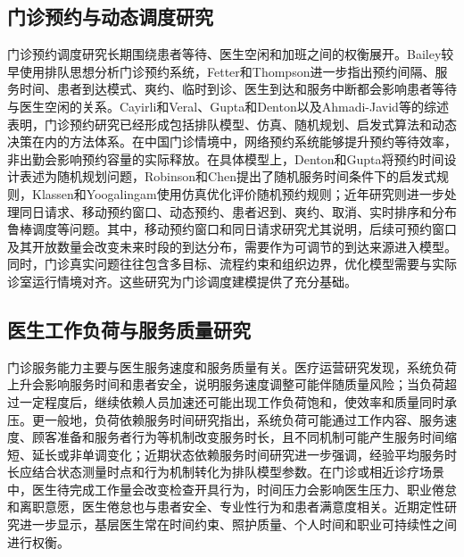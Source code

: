 \documentclass[a4paper,zihao=-4]{ctexart}
\numberwithin{figure}{section}
\numberwithin{table}{section}
\begin{document}
\subsection{门诊预约与动态调度研究}

门诊预约调度研究长期围绕患者等待、医生空闲和加班之间的权衡展开。Bailey较早使用排队思想分析门诊预约系统\citep{Bailey1952}，Fetter和Thompson进一步指出预约间隔、服务时间、患者到达模式、爽约、临时到诊、医生到达和服务中断都会影响患者等待与医生空闲的关系\citep{FetterThompson1966}。Cayirli和Veral、Gupta和Denton以及Ahmadi-Javid等的综述表明，门诊预约研究已经形成包括排队模型、仿真、随机规划、启发式算法和动态决策在内的方法体系\citep{CayirliVeral2003,GuptaDenton2008,AhmadiJavid2017,Hulshof2012,YounGeismarPinedo2022}。在中国门诊情境中，网络预约系统能够提升预约等待效率，非出勤会影响预约容量的实际释放\citep{CaoWanTuShangEtAl2011}。在具体模型上，Denton和Gupta将预约时间设计表述为随机规划问题\citep{DentonGupta2003}，Robinson和Chen提出了随机服务时间条件下的启发式规则\citep{RobinsonChen2003}，Klassen和Yoogalingam使用仿真优化评价随机预约规则\citep{KlassenYoogalingam2009}；近年研究则进一步处理同日请求、移动预约窗口、动态预约、患者迟到、爽约、取消、实时排序和分布鲁棒调度等问题\citep{BalasubramanianBiehlDaiMuriel2014,DaiGengXie2021,LaanVanDeVrugtOlsmanBoucherie2018,LiuZiyaKulkarni2010,SamoraniLaGanga2015,ZhangShenErdogan2017}。其中，移动预约窗口和同日请求研究尤其说明，后续可预约窗口及其开放数量会改变未来时段的到达分布，需要作为可调节的到达来源进入模型。同时，门诊真实问题往往包含多目标、流程约束和组织边界，优化模型需要与实际诊室运行情境对齐\citep{KuiperDeMastMandjes2021}。这些研究为门诊调度建模提供了充分基础。

\subsection{医生工作负荷与服务质量研究}

门诊服务能力主要与医生服务速度和服务质量有关。医疗运营研究发现，系统负荷上升会影响服务时间和患者安全，说明服务速度调整可能伴随质量风险\citep{KcTerwiesch2009}；当负荷超过一定程度后，继续依赖人员加速还可能出现工作负荷饱和，使效率和质量同时承压\citep{BerryJaekerTucker2017}。更一般地，负荷依赖服务时间研究指出，系统负荷可能通过工作内容、服务速度、顾客准备和服务者行为等机制改变服务时长，且不同机制可能产生服务时间缩短、延长或非单调变化\citep{DelasayIngolfssonKolfalSchultz2019}；近期状态依赖服务时间研究进一步强调，经验平均服务时长应结合状态测量时点和行为机制转化为排队模型参数\citep{DingKolfalIngolfsson2025}。在门诊或相近诊疗场景中，医生待完成工作量会改变检查开具行为，时间压力会影响医生压力、职业倦怠和离职意愿，医生倦怠也与患者安全、专业性行为和患者满意度相关\citep{ErgunSahinGunesKocabiyikogluKeskin2022,PrasadPoplauBrownEtAl2020,HodkinsonZhouJohnsonEtAl2022}。近期定性研究进一步显示，基层医生常在时间约束、照护质量、个人时间和职业可持续性之间进行权衡\citep{NguyenHoncharovBallardEtAl2024}。
\end{document}
